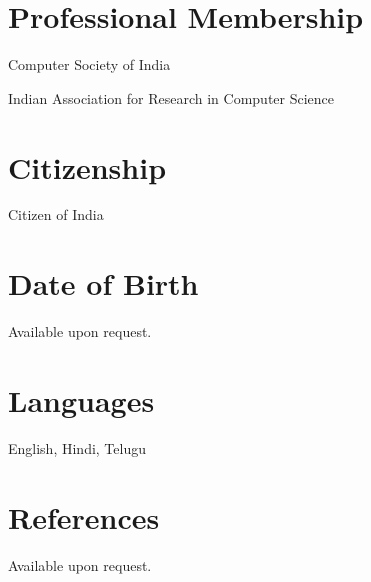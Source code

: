 \documentclass[11pt,margin,line]{res}
\begin{document}
\begin{resume}
\newpage

\section{\sc Professional Membership}

Computer Society of India

Indian Association for Research in Computer Science

\section{\sc Citizenship}
Citizen of India

\section{\sc Date of Birth}
Available upon request.

\section{\sc Languages}
English, Hindi, Telugu

\section{\sc References}
Available upon request.



\end{resume}
\end{document}
